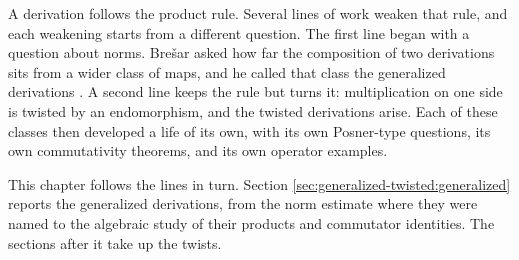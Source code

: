 A derivation follows the product rule. Several lines of work weaken that rule,
and each weakening starts from a different question. The first line began with
a question about norms. Brešar asked how far the composition of two
derivations sits from a wider class of maps, and he called that class the
generalized derivations \cite[p.~89]{Bresar1991Glasgow}. A second line keeps
the rule but turns it: multiplication on one side is twisted by an
endomorphism, and the twisted derivations arise. Each of these classes then
developed a life of its own, with its own Posner-type questions, its own
commutativity theorems, and its own operator examples.

This chapter follows the lines in turn. Section
\ref{sec:generalized-twisted:generalized} reports the generalized derivations,
from the norm estimate where they were named to the algebraic study of their
products and commutator identities. The sections after it take up the twists.
